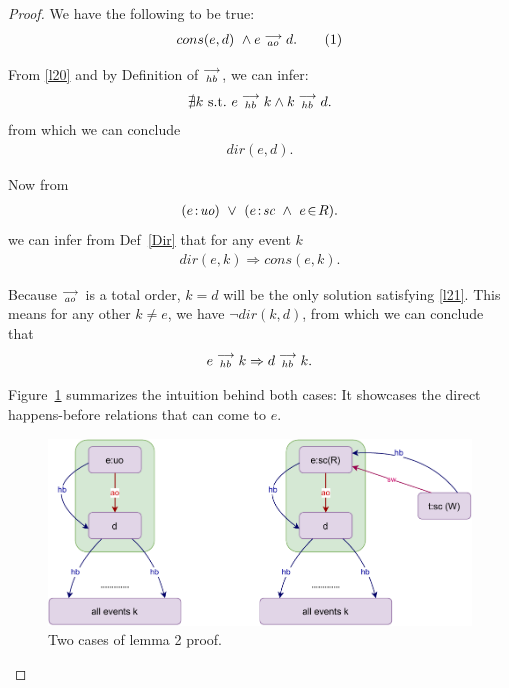 \begin{proof}
    
    We have the following to be true: 
    \begin{align*}
        cons(e,d) \ \wedge e\stackrel{\longrightarrow}{_{ao}}d.
        \tag{1}
        \label{l20}   
    \end{align*}

    From \ref{l20} and by Definition of $\stackrel{\longrightarrow}{_{hb}}$, we can infer:
    \begin{align*}
        \nexists k \ \text{s.t.} \ e\stackrel{\longrightarrow}{_{hb}}k \wedge k\stackrel{\longrightarrow}{_{hb}}d.
    \end{align*}
    from which we can conclude 
    \begin{align*}
        dir(e,d).
    \end{align*}

    Now from 
    \begin{align*}
        (e\!:\!\textit{uo}) \ \vee \
        (e\!:\!\textit{sc} \ \wedge \ e\!\in\!R). 
    \end{align*}
    we can infer from Def~\ref{Dir} that for any event $k$
    \begin{align*}
        dir(e,k) \Rightarrow cons(e,k).
        \tag{2}
        \label{l21}
    \end{align*}
        
    Because $\stackrel{\longrightarrow}{_{ao}}$ is a total order, $k=d$ will be the only solution satisfying \ref{l21}.  
    This means for any other $k \neq e$, we have $\neg dir(k,d)$, from which we can conclude that     
    \begin{align*}
        e\stackrel{\longrightarrow}{_{hb}}k \Rightarrow d\stackrel{\longrightarrow}{_{hb}}k.
    \end{align*}
     
    Figure~\ref{lemma:second} summarizes the intuition behind both cases: 
    It showcases the direct happens-before relations that can come to $e$.  
    \begin{figure}[H]
        \centering
        \includegraphics[scale=0.7]{4.InstructionReordering/3.Lemmas/Lemma2.pdf}
        \caption{Two cases of lemma 2 proof.}
        \label{lemma:second}
    \end{figure}

\end{proof}


